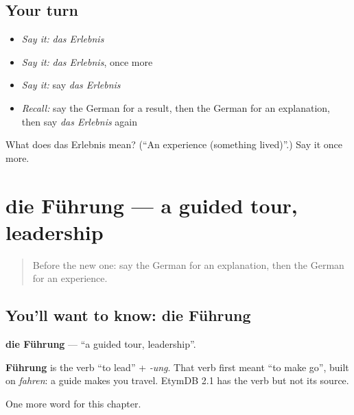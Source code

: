 \subsection*{Your turn}
\begin{itemize}
\raggedright
  \item \emph{Say it:} \emph{das Erlebnis}
  \item \emph{Say it:} \emph{das Erlebnis}, once more
  \item \emph{Say it:} say \emph{das Erlebnis}
  \item \emph{Recall:} say the German for a result, then the German for an explanation, then say \emph{das Erlebnis} again
\end{itemize}

\begin{tcolorbox}[breakable,colback=teal!4,colframe=teal!35!black,title={Before you move on}]
What does das Erlebnis mean? (\textquotedblleft{}An experience (something lived)\textquotedblright{}.) Say it once more.
\end{tcolorbox}
\section[die Führung]{die Führung — a guided tour, leadership}

\label{lesson:GE-C229-fuehrung}



\begin{quote}
Before the new one: say the German for an explanation, then the German for an experience.
\end{quote}

\subsection*{You'll want to know: die Führung}
\textbf{die Führung} — \textquotedblleft{}a guided tour, leadership\textquotedblright{}.

\begin{cousinweb}
\textbf{Führung} is the verb \textquotedblleft{}to lead\textquotedblright{} + \emph{-ung}. That verb first meant \textquotedblleft{}to make go\textquotedblright{}, built on \emph{fahren}: a guide makes you travel. EtymDB 2.1 has the verb but not its source.
\end{cousinweb}

\begin{grammarlens}[title={What you've built}]
One more word for this chapter.
\end{grammarlens}

